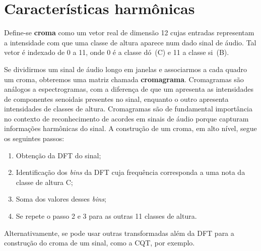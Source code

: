 \section{Características harmônicas}
\label{sec:cromagramas}

    Define-se \textbf{croma} como um vetor real de dimensão 12 cujas entradas representam a intensidade com que uma classe de altura aparece num dado sinal de áudio. Tal vetor é indexado de 0 a 11, onde 0 é a classe dó~(C) e 11 a classe si~(B).
    
    Se dividirmos um sinal de áudio longo em janelas e associarmos a cada quadro um croma, obteremos uma matriz chamada \textbf{cromagrama}. Cromagramas são análogos a espectrogramas, com a diferença de que um apresenta as intensidades de componentes senoidais presentes no sinal, enquanto o outro apresenta intensidades de classes de altura.
    Cromagramas são de fundamental importância no contexto de reconhecimento de acordes em sinais de áudio porque capturam informações harmônicas do sinal.
    A construção de um croma, em alto nível, segue os seguintes passos:
    
    \begin{enumerate}
        \item Obtenção da DFT do sinal;
        \item Identificação dos \textit{bins} da DFT cuja frequência corresponda a uma nota da classe de altura C;
        \item Soma dos valores desses \textit{bins};
        \item Se repete o passo 2 e 3 para as outras 11 classes de altura.
    \end{enumerate}
    
    Alternativamente, se pode usar outras transformadas além da DFT para a construção do croma de um sinal, como a CQT, por exemplo.